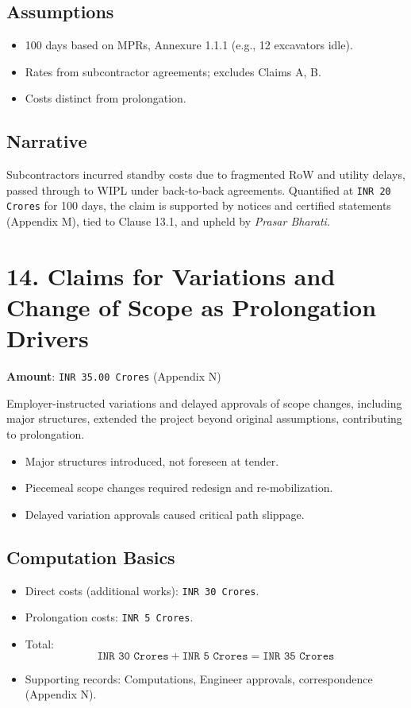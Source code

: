 \documentclass[12pt,letterpaper]{article}
\begin{document}
	\subsection*{Assumptions}
	\begin{itemize}
		\item 100 days based on MPRs, Annexure 1.1.1 (e.g., 12 excavators idle).
		\item Rates from subcontractor agreements; excludes Claims A, B.
		\item Costs distinct from prolongation.
	\end{itemize}
	
	\subsection*{Narrative}
	Subcontractors incurred standby costs due to fragmented RoW and utility delays, passed through to WIPL under back-to-back agreements. Quantified at \texttt{INR 20 Crores} for 100 days, the claim is supported by notices and certified statements (Appendix M), tied to Clause 13.1, and upheld by \textit{Prasar Bharati}.
	
	\section*{14. Claims for Variations and Change of Scope as Prolongation Drivers}
	\textbf{Amount}: \texttt{INR 35.00 Crores} (Appendix N)
	
	Employer-instructed variations and delayed approvals of scope changes, including major structures, extended the project beyond original assumptions, contributing to prolongation.
	
	\begin{itemize}
		\item Major structures introduced, not foreseen at tender.
		\item Piecemeal scope changes required redesign and re-mobilization.
		\item Delayed variation approvals caused critical path slippage.
	\end{itemize}
	
	\subsection*{Computation Basics}
	\begin{itemize}
		\item Direct costs (additional works): \texttt{INR 30 Crores}.
		\item Prolongation costs: \texttt{INR 5 Crores}.
		\item Total:
		\[
		\texttt{INR 30 Crores} + \texttt{INR 5 Crores} = \texttt{INR 35 Crores}
		\]
		\item Supporting records: Computations, Engineer approvals, correspondence (Appendix N).
	\end{itemize}
	
\end{document}
